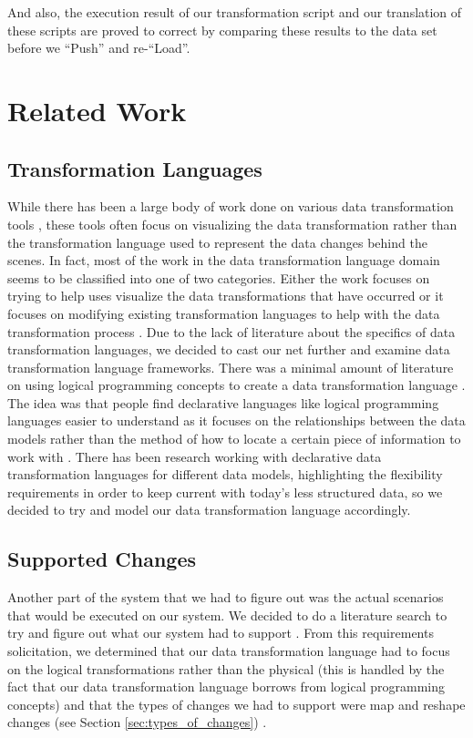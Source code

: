 \documentclass[12pt]{article}
\begin{document}
And also, the execution result of our transformation script and our translation of these scripts are proved to correct by comparing these results to the data set before we ``Push'' and re-``Load''.

\section{Related Work}
\subsection{Transformation Languages}
While there has been a large body of work done on various data transformation tools \cite{kandel2011wrangler, raman2001potter, kandel2012profiler}, these tools often focus on visualizing the data transformation rather than the transformation language used to represent the data changes behind the scenes. In fact, most of the work in the data transformation language domain seems to be classified into one of two categories. Either the work focuses on trying to help uses visualize the data transformations that have occurred \cite{kandel2011wrangler, raman2001potter, kandel2012profiler} or it focuses on modifying existing transformation languages to help with the data transformation process \cite{ilprints409, lakshmanan2001schemasql}. Due to the lack of literature about the specifics of data transformation languages, we decided to cast our net further and examine data transformation language frameworks. There was a minimal amount of literature on using logical programming concepts to create a data transformation language \cite{bry2002towards}. The idea was that people find declarative languages like logical programming languages easier to understand as it focuses on the relationships between the data models rather than the method of how to locate a certain piece of information to work with \cite{bry2002towards, tarau2009embedded}. There has been research working with declarative data transformation languages for different data models, highlighting the flexibility requirements in order to keep current with today's less structured data, \cite{bry2002towards, lawley2006practical, tarau2009embedded} so we decided to try and model our data transformation language accordingly.

\subsection{Supported Changes}
Another part of the system that we had to figure out was the actual scenarios that would be executed on our system. We decided to do a literature search to try and figure out what our system had to support \cite{galhardas:inria-00072476, kandel2011wrangler, kandel2012profiler,rahm2000data, raman2001potter}. From this requirements solicitation, we determined that our data transformation language had to focus on the logical transformations rather than the physical (this is handled by the fact that our data transformation language borrows from logical programming concepts) and that the types of changes we had to support were map and reshape changes (see Section \ref{sec:types_of_changes}) \cite{kandel2011wrangler}.
\end{document}
